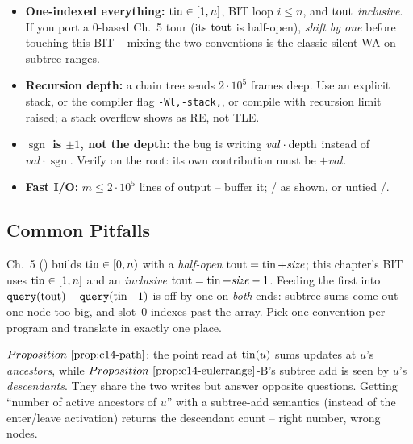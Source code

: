 \begin{hardeningbox}
\begin{itemize}[nosep,leftmargin=1.4em]
  \item \textbf{One-indexed everything:} \(\operatorname{tin}\in[1,n]\), BIT loop
        \(i\le n\), and \(\operatorname{tout}\) \emph{inclusive}.  If you port a \(0\)-based
        Ch.~5 tour (its \(\operatorname{tout}\) is half-open), \emph{shift by one} before
        touching this BIT -- mixing the two conventions is the classic silent
        WA on subtree ranges.
  \item \textbf{Recursion depth:} a chain tree sends  \(2\cdot10^5\)
        frames deep.  Use an explicit stack, or the compiler flag
        \texttt{-Wl,-stack,}, or compile with  recursion limit raised;
        a stack overflow shows as RE, not TLE.
  \item \textbf{\(\operatorname{sgn}\) is \(\pm1\), not the depth:} the bug is
        writing \(\mathit{val}\cdot\operatorname{depth}\) instead of \(\mathit{val}\cdot\operatorname{sgn}\).
        Verify on the root: its own contribution must be \(+\mathit{val}\).
  \item \textbf{Fast I/O:} \(m\le2\cdot10^5\) lines of output -- buffer it;
        / as shown, or untied /.
\end{itemize}
\end{hardeningbox}

\subsection{Common Pitfalls}

\begin{warningbox}
Ch.~5 () builds \(\operatorname{tin}\in[0,n)\) with a \emph{half-open}
\(\operatorname{tout}=\operatorname{tin}+\mathit{size}\); this chapter's BIT uses \(\operatorname{tin}\in[1,n]\) and an
\emph{inclusive} \(\operatorname{tout}=\operatorname{tin}+\mathit{size}-1\).  Feeding the first into
\(\texttt{query}(\operatorname{tout})-\texttt{query}(\operatorname{tin}-1)\) is off by one on \emph{both}
ends: subtree sums come out one node too big, and slot~0 indexes past the
array.  Pick one convention per program and translate in exactly one place.
\end{warningbox}

\begin{warningbox}
\(\propref{c14-path}\): the point read at \(\operatorname{tin}(u)\) sums updates at
\(u\)'s \emph{ancestors}, while \(\propref{c14-eulerrange}\)-B's subtree add is
seen by \(u\)'s \emph{descendants}.  They share the two writes but answer
opposite questions.  Getting ``number of active ancestors of \(u\)'' with a
subtree-add semantics (instead of the enter/leave activation) returns the
descendant count -- right number, wrong nodes.
\end{warningbox}

